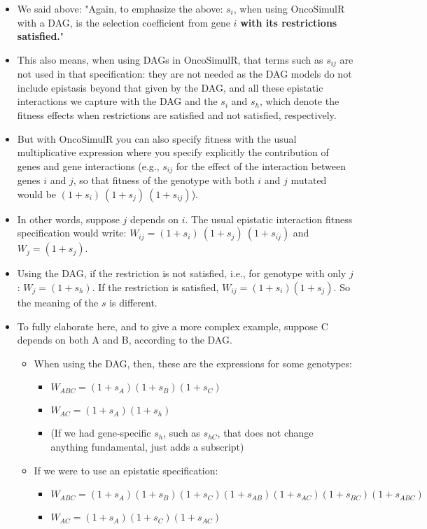 \documentclass[11pt]{article}
\begin{document}
\begin{itemize}
\item We said above: "Again, to emphasize the above: \(s_i\), when using OncoSimulR with a DAG, is the selection coefficient from gene \(i\) \textbf{with its restrictions satisfied.}"

\item This also means, when using DAGs in OncoSimulR, that terms such as \(s_{ij}\) are not used in that specification: they are not needed as the DAG models do not include epistasis beyond that given by the DAG, and all these epistatic interactions we capture with the DAG and the \(s_i\) and \(s_h\), which denote the fitness effects when restrictions are satisfied and not satisfied, respectively.

\item But with OncoSimulR you can also specify fitness with the usual multiplicative expression where you specify explicitly the contribution of genes and gene interactions (e.g., \(s_{ij}\) for the effect of the interaction between genes \(i\) and \(j\), so that fitness of the genotype with both \(i\) and \(j\) mutated would be \((1 + s_i)\ (1 + s_j)\ (1 + s_{ij})\)).

\item In other words, suppose \(j\) depends on \(i\). The usual epistatic interaction fitness specification would write: \(W_{ij} = (1 + s_i)\ (1 + s_j)\ (1 + s_{ij})\) and \(W_j = (1 + s_j)\).

\item Using the DAG, if the restriction is not satisfied, i.e., for genotype with only \(j\): \(W_j = (1 + s_h)\). If the restriction is satisfied, \(W_{ij} = (1 + s_i) (1 + s_j)\). So the meaning of the \(s\) is different.

\item To fully elaborate here, and to give a more complex example, suppose C depends on both A and B, according to the DAG. 

\begin{itemize}
\item When using the DAG, then, these are
the expressions for some genotypes:
\begin{itemize}
\item \(W_{ABC} = (1 + s_A) (1 + s_B) (1 + s_C)\)
\item \(W_{AC}  = (1 + s_A) (1 + s_h)\)
\item (If we had gene-specific \(s_h\), such as \(s_{hC}\), that does not
change anything fundamental, just adds a subscript)
\end{itemize}
\item If we were to use an epistatic specification:
\begin{itemize}
\item \(W_{ABC} = (1 + s_A) (1 + s_B) (1 + s_C) (1 + s_{AB}) (1 + s_{AC}) (1 + s_{BC}) (1 + s_{ABC})\)
\item \(W_{AC}  = (1 + s_A) (1 + s_C) (1 + s_{AC})\)
\end{itemize}
\end{itemize}


\end{itemize}
\end{document}
